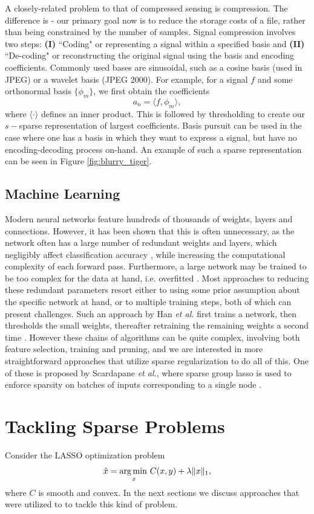 \documentclass[11pt, twoside]{report}
\begin{document}
A closely-related problem to that of compressed sensing is compression. The difference is - our primary goal now is to reduce the storage costs of a file, rather than being constrained by the number of samples. Signal compression involves two steps: \textbf{(I)} ``Coding" or representing a signal within a specified basis and \textbf{(II)} ``De-coding" or reconstructing the original signal using the basis and encoding coefficients. Commonly used bases are sinusoidal, such as a cosine basis (used in JPEG) or a wavelet basis (JPEG 2000). For example, for a signal $f$ and some orthonormal basis $\{\phi_m\}$, we first obtain the coefficients
\[a_n = \langle f,\phi_m \rangle,\]
where $\langle \cdot \rangle$ defines an inner product. This is followed by thresholding to create our $s-$sparse representation of largest coefficients. Basis pursuit can be used in the case where one has a basis in which they want to express a signal, but have no encoding-decoding process on-hand. An example of such a sparse representation can be seen in Figure \ref{fig:blurry_tiger}.

\subsection{Machine Learning}
Modern neural networks feature hundreds of thousands of weights, layers and connections. However, it has been shown that this is often unnecessary, as the network often has a large number of redundant weights and layers, which negligibly affect classification accuracy \cite{nn_toomuch}, while increasing the computational complexity of each forward pass. Furthermore, a large network may be trained to be too complex for the data at hand, i.e. overfitted \cite{nn_useful}. Most approaches to reducing these redundant parameters resort either to using some prior assumption about the specific network at hand, or to multiple training steps, both of which can present challenges. Such an approach by Han {\em et al.} first trains a network, then thresholds the small weights, thereafter retraining the remaining weights a second time \cite{nn_thresh}. However these chains of algorithms can be quite complex, involving both feature selection, training and pruning, and we are interested in more straightforward approaches that utilize sparse regularization to do all of this. One of these is proposed by Scardapane {\em et al.}, where sparse group lasso is used to enforce sparsity on batches of inputs corresponding to a single node \cite{nn_reg}.

\section{Tackling Sparse Problems}
Consider the LASSO optimization problem
\begin{equation} \label{xlasso}
\hat{x} = \operatorname*{arg\, min \,}_{x} C(x,y) + \lambda \|x\|_1,
\end{equation}
where $C$ is smooth and convex. In the next sections we discuss approaches that were utilized to to tackle this kind of problem.
\end{document}
